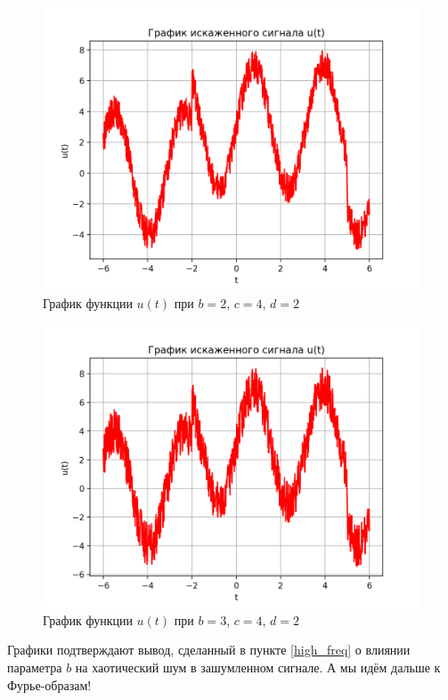 \begin{figure}[ht!]
    \centering
    \includegraphics[scale=0.75]{media/1 task/specific_freq/Noisy_2_4_2.png}
    \caption{График функции $u(t)$ при $b=2$,  $c=4$,  $d=2$}
    \label{fig:noisy_2_4_2}
\end{figure}

\clearpage

\begin{figure}[ht!]
    \centering
    \includegraphics[scale=0.75]{media/1 task/specific_freq/Noisy_3_4_2.png}
    \caption{График функции $u(t)$ при $b=3$,  $c=4$,  $d=2$}
    \label{fig:noisy_3_4_2}
\end{figure}

Графики подтверждают вывод, сделанный в пункте \ref{high_freq}  о влиянии параметра $b$ на хаотический шум в зашумленном сигнале. А мы идём дальше к Фурье-образам!

